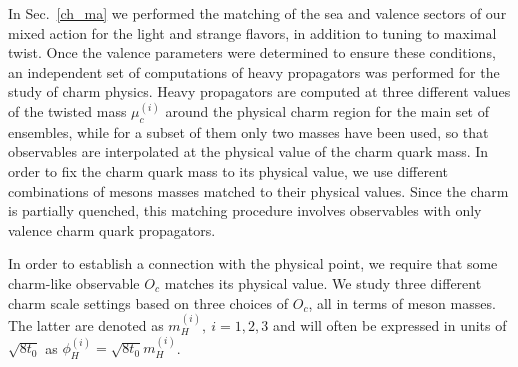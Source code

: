 In Sec.~\ref{ch_ma} we performed the matching of the sea and valence sectors of our mixed action for the light and strange flavors, in addition to tuning to maximal twist. Once the valence parameters were determined to ensure these conditions, an independent set of computations of heavy propagators was performed for the study of charm physics. Heavy propagators are computed at three different values of the twisted  mass $\mu_c^{(i)}$ around the physical charm region for the main set of ensembles, while for a subset of them only two masses have been used, so that observables are interpolated at the physical value of the charm quark mass. In order to fix the charm quark mass to its physical value, we use different combinations of mesons masses matched to their physical values. Since the charm is partially quenched, this matching procedure involves observables with only valence charm quark propagators. 
%

%
In order to establish a connection with the physical point, we require that some charm-like observable $O_c$ matches its physical value. We study three different charm scale settings based on three choices of $O_c$, all in terms of meson masses. The latter are denoted as $m_H^{(i)},~i=1,2,3$ and will often be expressed in units of $\sqrt{8t_0}$ as $\phi_H^{(i)} = \sqrt{8t_0}m_H^{(i)}$.
%

